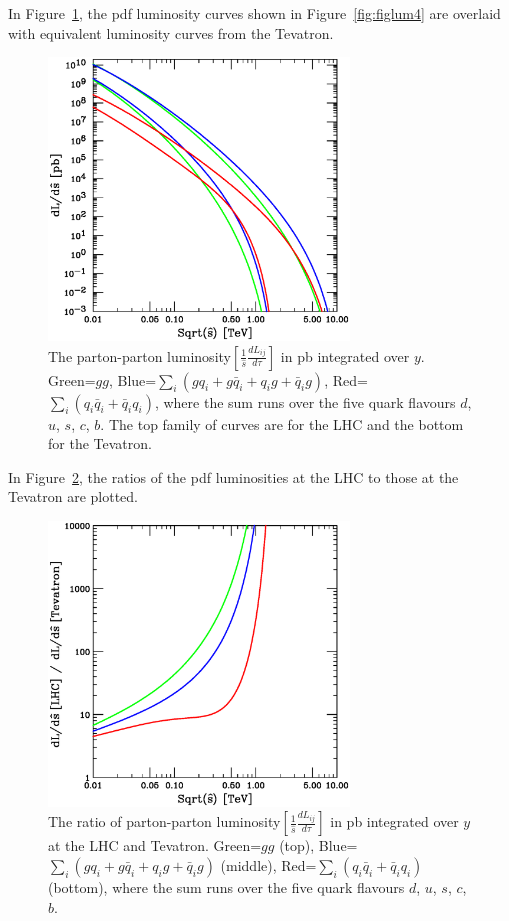 \documentclass[12pt]{iopart}
\begin{document}
In Figure~\ref{fig:figlum12}, the pdf luminosity curves shown in Figure~\ref{fig:figlum4} are overlaid with
equivalent luminosity curves from the Tevatron.
%
\begin{figure}[t]
\begin{center}
\includegraphics[width=8cm]{figlum12.ps}
\end{center}
\caption{
The parton-parton luminosity$\left[\frac{1}{\hat{s}}\frac{dL_{ij}}{d\tau}\right]$ in pb
integrated over $y$. 
Green=$gg$, 
Blue=$\sum_i (gq_i+g{\bar q}_i+q_ig+{\bar q}_ig)$,
Red=$\sum_i (q_i{\bar q}_i+{\bar q}_iq_i)$,
where the sum runs over the five quark flavours $d$, $u$, $s$, $c$, $b$.
The top family of curves are for the LHC and the bottom  for the Tevatron. 
} 
\label{fig:figlum12}
\end{figure}
%
In Figure~\ref{fig:figlum13}, the ratios of the pdf luminosities
at the LHC to those at the Tevatron are plotted.
%
\begin{figure}[t]
\begin{center}
\includegraphics[width=8cm]{figlum13.ps}
\end{center}
\caption{
The ratio of parton-parton luminosity$\left[\frac{1}{\hat{s}}\frac{dL_{ij}}{d\tau}\right]$ in pb
integrated over $y$ at the LHC and Tevatron. 
Green=$gg$ (top), 
Blue=$\sum_i (gq_i+g{\bar q}_i+q_ig+{\bar q}_ig)$ (middle),
Red=$\sum_i (q_i{\bar q}_i+{\bar q}_iq_i)$ (bottom),
where the sum runs over the five quark flavours $d$, $u$, $s$, $c$, $b$. 
\label{fig:figlum13}}
\end{figure}
\end{document}
